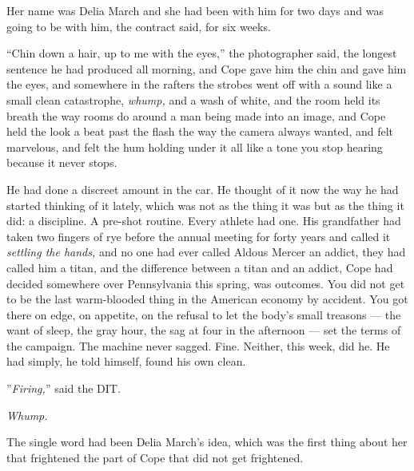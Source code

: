 \documentclass[11pt,openany]{book}
\newcommand{\scenebreak}{\par\vspace{0.5\baselineskip}\begin{center}\textasteriskcentered\quad\textasteriskcentered\quad\textasteriskcentered\end{center}\vspace{0.5\baselineskip}\par}
\begin{document}
Her name was Delia March and she had been with him for two days and was going to be with him, the contract said, for six weeks.

``Chin down a hair, up to me with the eyes,'' the photographer said, the longest sentence he had produced all morning, and Cope gave him the chin and gave him the eyes, and somewhere in the rafters the strobes went off with a sound like a small clean catastrophe, \textit{whump,} and a wash of white, and the room held its breath the way rooms do around a man being made into an image, and Cope held the look a beat past the flash the way the camera always wanted, and felt marvelous, and felt the hum holding under it all like a tone you stop hearing because it never stops.

He had done a discreet amount in the car. He thought of it now the way he had started thinking of it lately, which was not as the thing it was but as the thing it did: a discipline. A pre-shot routine. Every athlete had one. His grandfather had taken two fingers of rye before the annual meeting for forty years and called it \textit{settling the hands,} and no one had ever called Aldous Mercer an addict, they had called him a titan, and the difference between a titan and an addict, Cope had decided somewhere over Pennsylvania this spring, was outcomes. You did not get to be the last warm-blooded thing in the American economy by accident. You got there on edge, on appetite, on the refusal to let the body's small treasons --- the want of sleep, the gray hour, the sag at four in the afternoon --- set the terms of the campaign. The machine never sagged. Fine. Neither, this week, did he. He had simply, he told himself, found his own clean.

''\textit{Firing,}'' said the DIT.

\textit{Whump.}


\scenebreak


The single word had been Delia March's idea, which was the first thing about her that frightened the part of Cope that did not get frightened.
\end{document}
